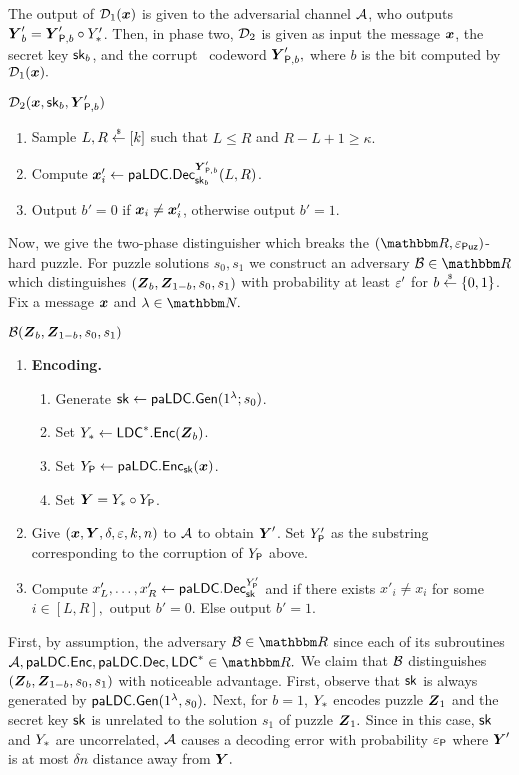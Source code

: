 \begin{IEEEproof}
    The output of $\mathcal{D}_1({\boldsymbol{x}})$ is given to the adversarial channel $\mathcal{A}$, who outputs  $\boldsymbol{Y}_b' = \boldsymbol{Y}'_{\mathsf{P},b} \circ Y_{*}'$.
    Then, in phase two, $\mathcal{D}_2$ is given as input the message ${\boldsymbol{x}}$, the secret key $\mathsf{sk}_b$, and the corrupt \paLDC\ codeword $\boldsymbol{Y}'_{\mathsf{P},b},$ where $b$ is the bit computed by $\mathcal{D}_1({\boldsymbol{x}}).$
    \begin{weirdFrame}{$\mathcal{D}_2({\boldsymbol{x}},\mathsf{sk}_b,\boldsymbol{Y}'_{\mathsf{P},b})$}
        \begin{enumerate}
            \item Sample $L,R \overset{{\scriptscriptstyle\$}}{\leftarrow} [k]$ such that $L \leq R$ and $R - L + 1 \geq \kappa.$
            \item Compute ${\boldsymbol{x}}_i' \leftarrow \mathsf{paLDC}.\mathsf{Dec}^{\boldsymbol{Y}'_{\mathsf{P},b}}_{\mathsf{sk}_b}(L,R)$.
            \item Output $b' = 0$ if ${\boldsymbol{x}}_i \neq {\boldsymbol{x}}_i'$, otherwise output $b' = 1.$
        \end{enumerate}
    \end{weirdFrame}
    Now, we give the two-phase distinguisher which breaks the $(\R,\epsPuz)$-hard puzzle. 
    For puzzle solutions $s_0,s_1$ we construct an adversary $\calB \in \R$ which distinguishes $(\boldsymbol{Z}_b,\boldsymbol{Z}_{1 - b},s_0,s_1)$ with probability at least $\varepsilon'$ for $b \overset{{\scriptscriptstyle\$}}{\leftarrow} \{0,1\}$.
    Fix a message ${\boldsymbol{x}}$ and $\lambda \in \N.$
    \begin{weirdFrame}{$\mathcal{B}(\boldsymbol{Z}_b,\boldsymbol{Z}_{1 -b},s_0,s_1)$}
        \begin{enumerate}
            \item  \textbf{Encoding.}
        \begin{enumerate}
            \item Generate $\mathsf{sk} \leftarrow \mathsf{paLDC}.\mathsf{Gen}(1^\lambda;s_0)$.
            \item Set $Y_{*} \leftarrow \mathsf{LDC}^*.\mathsf{Enc}(\boldsymbol{Z}_b)$.
            \item Set $Y_{\mathsf{P}} \leftarrow \mathsf{paLDC}.\mathsf{Enc}_{\mathsf{sk}}({\boldsymbol{x}})$.
            \item Set $\boldsymbol{Y} = Y_{*} \circ Y_{\mathsf{P}}$.
        \end{enumerate}
        \item Give $({\boldsymbol{x}},\boldsymbol{Y},\delta,\varepsilon,k,n)$ to $\mathcal{A}$ to obtain $\boldsymbol{Y}'$. 
        Set $Y_{\mathsf{P}}'$ as the substring corresponding to the corruption of $Y_{\mathsf{P}}$ above.
        \item Compute $x'_L,\dots, x'_R \leftarrow \mathsf{paLDC}.\mathsf{Dec}_{\mathsf{sk}}^{Y_{\mathsf{P}}'}$ and if there exists $x'_i \neq x_i$ for some $i \in [L,R],$ output $b' = 0$. 
        Else output $b' = 1.$
        \end{enumerate}
    \end{weirdFrame}
    First, by assumption, the adversary $\calB \in \R$ since each of its subroutines $\calA, \paLDC.\Enc, \paLDC.\Dec,\LDCStar \in \R.$
    We claim that $\mathcal{B}$ distinguishes $(\boldsymbol{Z}_b,\boldsymbol{Z}_{1 -b},s_0,s_1)$ with noticeable advantage. 
    First, observe that $\mathsf{sk}$ is always generated by $\mathsf{paLDC}.\mathsf{Gen}(1^\lambda,s_0).$
    Next, for $b = 1$, $Y_{*}$ encodes puzzle $\boldsymbol{Z}_1$ and the secret key $\mathsf{sk}$ is unrelated to the solution $s_1$ of puzzle $\boldsymbol{Z}_1.$
    Since in this case, $\mathsf{sk}$ and $Y_{*}$ are uncorrelated, $\mathcal{A}$ causes a decoding error with probability $\varepsilon_{\mathsf{P}}$ where $\boldsymbol{Y}'$ is at most $\delta n$ distance away from $\boldsymbol{Y}.$


\end{IEEEproof}
